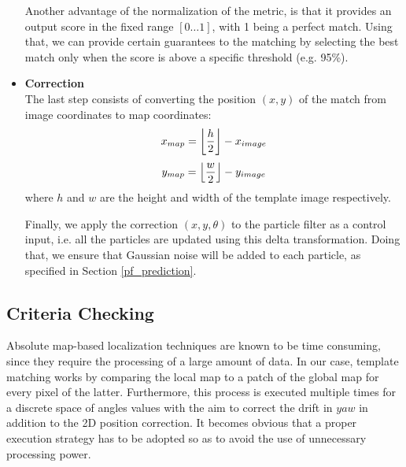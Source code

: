 \begin{itemize}
        Another advantage of the normalization of the metric, is that it
        provides an output score in the fixed range $[0 \dots 1]$, with
        1 being a perfect match. Using that, we can provide certain guarantees
        to the matching by selecting the best match only when the score is
        above a specific threshold (e.g. 95\%).


    \item \textbf{Correction} \\
        The last step consists of converting the position $(x, y)$ of the match
        from image coordinates to map coordinates:
        \begin{equation}
            x_{map} = \floor*{\frac{h}{2}} - x_{image}
        \end{equation}
        \begin{equation}
            y_{map} = \floor*{\frac{w}{2}} - y_{image}
        \end{equation}
        where $h$ and $w$ are the height and width of the template image
        respectively.

        Finally, we apply the correction $(x, y, \theta)$ to the particle
        filter as a control input, i.e. all the particles are updated using
        this delta transformation. Doing that, we ensure that Gaussian
        noise will be added to each particle, as specified in Section
        \ref{pf_prediction}.
\end{itemize}

\subsection{Criteria Checking} \label{pose_correction_criteria}

Absolute map-based localization techniques are known to be time consuming,
since they require the processing of a large amount of data.
In our case, template matching works by comparing the local map
to a patch of the global map for every pixel of the latter.
Furthermore, this process is executed multiple times for a discrete space
of angles values with the aim to correct the drift in $yaw$ in addition to
the 2D position correction.
It becomes obvious that a proper execution strategy has to be
adopted so as to avoid the use of unnecessary processing power.

